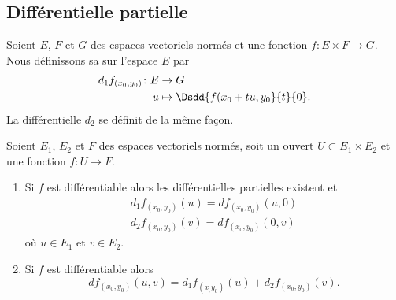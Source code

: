 \subsection{Différentielle partielle}

\begin{definition}    \label{VJM_CtSKT}
    Soient \( E\), \( F\) et \( G\) des espaces vectoriels normés et une fonction \( f\colon E\times F\to G\). Nous définissons sa  sur l'espace \( E\) par
    \begin{equation}
        \begin{aligned}
            d_1f_{(x_0,y_0)}\colon E&\to G \\
            u&\mapsto \Dsdd{ f(x_0+tu,y_0 }{t}{0} .
        \end{aligned}
    \end{equation}
    La différentielle \( d_2\) se définit de la même façon.
\end{definition}

\begin{proposition} \label{PropLDN_nHWDF}
    Soient \( E_1\), \( E_2\) et \( F\) des espaces vectoriels normés, soit un ouvert \( U\subset E_1\times E_2\) et une fonction \( f\colon U\to F\).
    \begin{enumerate}
        \item   \label{ItemRDD_oPmXVi}
            Si \( f\) est différentiable alors les différentielles partielles existent et
            \begin{subequations}
                \begin{align}
                    d_1f_{(x_0,y_0)}(u)=df_{(x_0,y_0)}(u,0)\\
                    d_2f_{(x_0,y_0)}(v)=df_{(x_0,y_0)}(0,v)
                \end{align}
            \end{subequations}
            où \( u\in E_1\) et \( v\in E_2\).
        \item
            Si \( f\) est différentiable alors
            \begin{equation}
                df_{(x_0,y_0)}(u,v)=d_1f_{(x_,y_0)}(u)+d_2f_{(x_0,y_0)}(v).
            \end{equation}
    \end{enumerate}
\end{proposition}

